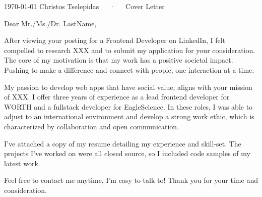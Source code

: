 \documentclass[11pt, a4paper]{awesome-cv}
\begin{document}
\makecvheader[C]

\makecvfooter
  {\today}
  {Christos Tselepidas~~~·~~~Cover Letter}
  {}

\makelettertitle

\begin{cvletter}


Dear Mr./Ms./Dr. LastName,

After viewing your posting for a Frontend Developer on LinkedIn, I felt compelled to research XXX and to submit my application for your consideration. The core of my motivation is that my work has a positive societal impact. Pushing to make a difference and connect with people, one interaction at a time. 

My passion to develop web apps that have social value, aligns with your mission of XXX. I offer three years of experience as a lead frontend developer for WORTH and a fullstack developer for EagleScience. In these roles, I was able to adjust to an international environment and develop a strong work ethic, which is characterized by collaboration and open communication.

I’ve attached a copy of my resume detailing my experience and skill-set. The projects I've worked on were all closed source, so I included code samples of my latest work.

Feel free to contact me anytime, I'm easy to talk to! Thank you for your time and consideration.

\end{cvletter}


\makeletterclosing
\end{document}
